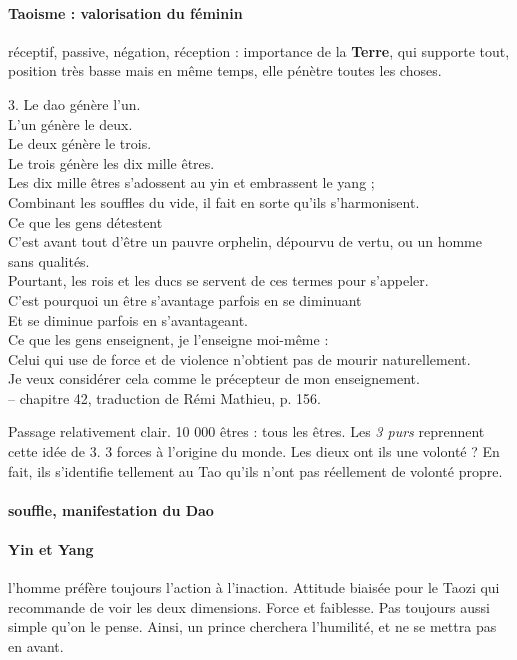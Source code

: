 \paragraph{Taoisme : valorisation du féminin} réceptif, passive, négation, réception : importance de la \textbf{Terre}, qui supporte tout, position très basse mais en même temps, elle pénètre toutes les choses.

 \begin{singlequote}
     3.	Le dao génère l’un. \\
L’un génère le deux. \\ Le deux génère le trois. \\
Le trois génère les dix mille êtres. \\
Les dix mille êtres s’adossent au yin et embrassent le yang ; \\Combinant les souffles du vide, il fait en sorte qu’ils s’harmonisent.\\ Ce que les gens détestent
\\C’est avant tout d’être un pauvre orphelin, dépourvu de vertu, ou un homme sans qualités. \\Pourtant, les rois et les ducs se servent de ces termes pour s’appeler. \\
 C’est pourquoi un être s’avantage parfois en se diminuant \\ Et se diminue parfois en s’avantageant. \\
Ce que les gens enseignent, je l’enseigne moi-même : \\
Celui qui use de force et de violence n’obtient pas de mourir naturellement. \\Je veux considérer cela comme le précepteur de mon enseignement. \\
-- chapitre 42, traduction de Rémi Mathieu, p. 156.
 \end{singlequote}

Passage relativement clair. 10 000 êtres : tous les êtres. 
Les \textit{3 purs} reprennent cette idée de 3. 3 forces à l'origine du monde.
Les dieux ont ils une volonté ? En fait, ils s'identifie tellement au Tao qu'ils n'ont pas réellement de volonté propre.
\paragraph{souffle, manifestation du Dao}

\paragraph{Yin et Yang} l'homme préfère toujours l'action à l'inaction.  Attitude biaisée pour le Taozi qui recommande de voir les deux dimensions. 
Force et faiblesse. Pas toujours aussi simple qu'on le pense. Ainsi, un prince cherchera l'humilité, et ne se mettra pas en avant. 


